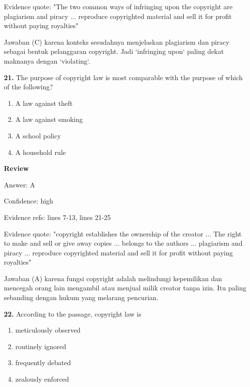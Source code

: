 \documentclass[12pt]{article}
\begin{document}
Evidence quote: "The two common ways of infringing upon the copyright are plagiarism and piracy ... reproduce copyrighted material and sell it for profit without paying royalties"\par
Jawaban (C) karena konteks sesudahnya menjelaskan plagiarism dan piracy sebagai bentuk pelanggaran copyright. Jadi `infringing upon` paling dekat maknanya dengan `violating`.\par
\endgroup
\par
\vspace{0.25\baselineskip}
\noindent\textbf{21.} The purpose of copyright law is most comparable with the purpose of which of the following?
\begin{enumerate}[label=(\Alph*),leftmargin=*,itemsep=0.2em]
\item A law against theft
\item A law against smoking
\item A school policy
\item A household rule
\end{enumerate}
\par
\begingroup
\setlength{\parskip}{0pt}
\setlength{\parindent}{0pt}
\textbf{Review}\par
Answer: A\par
Confidence: high\par
Evidence refs: lines 7-13, lines 21-25\par
Evidence quote: "copyright establishes the ownership of the creator ... The right to make and sell or give away copies ... belongs to the authors ... plagiarism and piracy ... reproduce copyrighted material and sell it for profit without paying royalties"\par
Jawaban (A) karena fungsi copyright adalah melindungi kepemilikan dan mencegah orang lain mengambil atau menjual milik creator tanpa izin. Itu paling sebanding dengan hukum yang melarang pencurian.\par
\endgroup
\par
\vspace{0.25\baselineskip}
\noindent\textbf{22.} According to the passage, copyright law is
\begin{enumerate}[label=(\Alph*),leftmargin=*,itemsep=0.2em]
\item meticulously observed
\item routinely ignored
\item frequently debated
\item zealously enforced
\end{enumerate}
\end{document}

